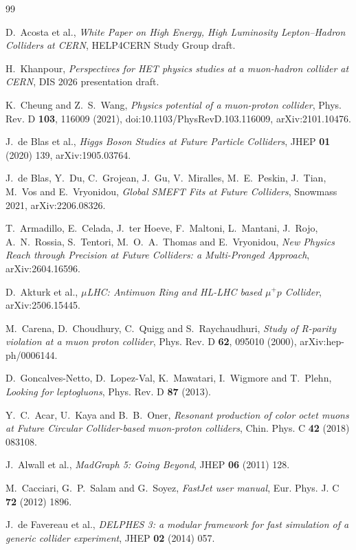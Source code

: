 \documentclass[11pt,a4paper]{article}
\begin{document}
\begin{thebibliography}{99}

D.~Acosta et al.,
\emph{White Paper on High Energy, High Luminosity Lepton--Hadron Colliders at CERN},
HELP4CERN Study Group draft.

H.~Khanpour,
\emph{Perspectives for HET physics studies at a muon-hadron collider at CERN},
DIS 2026 presentation draft.

K.~Cheung and Z.~S.~Wang,
\emph{Physics potential of a muon-proton collider},
Phys. Rev. D \textbf{103}, 116009 (2021),
doi:10.1103/PhysRevD.103.116009,
arXiv:2101.10476.

J.~de Blas et al.,
\emph{Higgs Boson Studies at Future Particle Colliders},
JHEP \textbf{01} (2020) 139,
arXiv:1905.03764.

J.~de Blas, Y.~Du, C.~Grojean, J.~Gu, V.~Miralles, M.~E.~Peskin, J.~Tian, M.~Vos and E.~Vryonidou,
\emph{Global SMEFT Fits at Future Colliders},
Snowmass 2021,
arXiv:2206.08326.

T.~Armadillo, E.~Celada, J.~ter Hoeve, F.~Maltoni, L.~Mantani, J.~Rojo, A.~N.~Rossia,
S.~Tentori, M.~O.~A.~Thomas and E.~Vryonidou,
\emph{New Physics Reach through Precision at Future Colliders: a Multi-Pronged Approach},
arXiv:2604.16596.

D.~Akturk et al.,
\emph{\(\mu\)LHC: Antimuon Ring and HL-LHC based \(\mu^+p\) Collider},
arXiv:2506.15445.

M.~Carena, D.~Choudhury, C.~Quigg and S.~Raychaudhuri,
\emph{Study of R-parity violation at a muon proton collider},
Phys. Rev. D \textbf{62}, 095010 (2000),
arXiv:hep-ph/0006144.

D.~Goncalves-Netto, D.~Lopez-Val, K.~Mawatari, I.~Wigmore and T.~Plehn,
\emph{Looking for leptogluons},
Phys. Rev. D \textbf{87} (2013).

Y.~C.~Acar, U.~Kaya and B.~B.~Oner,
\emph{Resonant production of color octet muons at Future Circular Collider-based muon-proton colliders},
Chin. Phys. C \textbf{42} (2018) 083108.

J.~Alwall et al.,
\emph{MadGraph 5: Going Beyond},
JHEP \textbf{06} (2011) 128.

M.~Cacciari, G.~P.~Salam and G.~Soyez,
\emph{FastJet user manual},
Eur. Phys. J. C \textbf{72} (2012) 1896.

J.~de Favereau et al.,
\emph{DELPHES 3: a modular framework for fast simulation of a generic collider experiment},
JHEP \textbf{02} (2014) 057.

\end{thebibliography}
\end{document}
